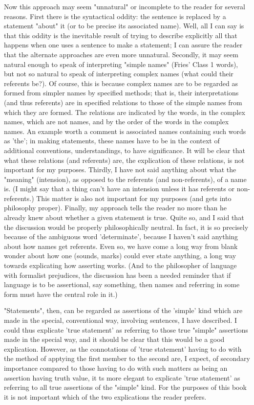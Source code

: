\documentclass[10pt,twoside]{memoir}
\begin{document}
\begin{enumerate}
Now this approach may seem "unnatural" or incomplete to the reader 
for several reasons. First there is the syntactical oddity: the sentence is 
replaced by a statement "about" it (or to be precise its associated name). 
Well, all I can say is that this oddity is the inevitable result of trying to 
describe explicitly all that happens when one uses a sentence to make a 
statement; I can assure the reader that the alternate approaches are even 
more unnatural. Secondly, it may seem natural enough to speak of 
interpreting "simple names" (Fries' Class 1 words), but not so natural to 
speak of interpreting complex names (what could their referents be?). Of 
course, this is because complex names are to be regarded as formed from 
simpler names by specified methods; that is, their interpretations (and thus 
referents) are in specified relations to those of the simple names from which 
they are formed. The relations are indicated by the words, in the complex 
names, which are not names, and by the order of the words in the complex 
names. An example worth a comment is associated names containing such 
words as 'the'; in making statements, these names have to be in the context 
of additional conventions, understandings, to have significance. It will be 
clear that what these relations (and referents) are, the explication of these 
relations, is not important for my purposes. Thirdly, I have not said anything 
about what the "meaning" (intension), as opposed to the referents (and 
non-referents), of a name is. (I might say that a thing can't have an intension 
unless it has referents or non-referents.) This matter is also not important for 
my purposes (and gets into philosophy proper). Finally, my approach tells 
the reader no more than he already knew about whether a given statement is 
true. Quite so, and I said that the discussion would be properly 
philosophically neutral. In fact, it is so precisely because of the ambiguous 
word 'determinate', because I haven't said anything about how names get 
referents. Even so, we have come a long way from blank wonder about how 
one (sounds, marks) could ever state anything, a long way towards 
explicating how asserting works. (And to the philosopher of language with 
formalist prejudices, the discussion has been a needed reminder that if 
language is to be assertional, say something, then names and referring in 
some form must have the central role in it.) 

"Statements", then, can be regarded as assertions of the 'simple' kind 
which are made in the special, conventional way, involving sentences, I have 
described. I could thus explicate 'true statement' as referring to those true 
"simple" assertions made in the special way, and it should be clear that this 
would be a good explication. However, as the connotations of 'true 
statement' having to do with the method of apptying the first member to the 
second are, I expect, of secondary importance compared to those having to 
do with such matters as being an assertion having truth value, it ts more 
elegant to explicate 'true statement' as referring to all true assertions of the 
"simple" kind. For the purposes of this book it is not important which of 
the two explications the reader prefers. 


\end{enumerate}
\end{document}
